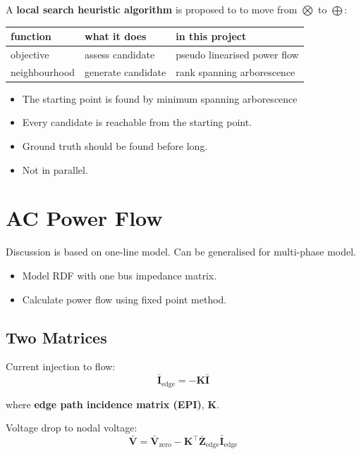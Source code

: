 \documentclass[
]{book}
\providecommand{\tightlist}{%
  \setlength{\itemsep}{0pt}\setlength{\parskip}{0pt}}
\begin{document}
A \textbf{local search heuristic algorithm} is proposed to to move from \(\bigotimes\)
to \(\bigoplus\):

\begin{table}[H]
\centering
\begin{tabular}[t]{l|l|l}
\hline
function & what it does & in this project\\
\hline
objective & assess candidate & pseudo linearised power flow\\
\hline
neighbourhood & generate candidate & rank spanning arborescence\\
\hline
\end{tabular}
\end{table}

\begin{itemize}
\tightlist
\item
  The starting point is found by minimum spanning arborescence
\item
  Every candidate is reachable from the starting point.
\item
  Ground truth should be found before long.
\item
  Not in parallel.
\end{itemize}

\hypertarget{ac-power-flow}{%
\chapter{AC Power Flow}\label{ac-power-flow}}

Discussion is based on one-line model. Can be generalised for multi-phase
model.

\begin{itemize}
\tightlist
\item
  Model RDF with one bus impedance matrix.
\item
  Calculate power flow using fixed point method.
\end{itemize}

\hypertarget{two-matrices}{%
\section{Two Matrices}\label{two-matrices}}

Current injection to flow:
\[
  \bar{\boldsymbol{I}}_{\text{edge}} =
  - \boldsymbol{K} \bar{\boldsymbol{I}}
\]

where \textbf{edge path incidence matrix (EPI)}, \(\boldsymbol{K}\).

Voltage drop to nodal voltage:
\[
  \bar{\boldsymbol{V}} =
  \bar{\boldsymbol{V}}_{\text{zero}}
  - \boldsymbol{K}^{\top} \boldsymbol{\bar{Z}}_\text{edge}
  \bar{\boldsymbol{I}}_{\text{edge}} 
\]
\end{document}
